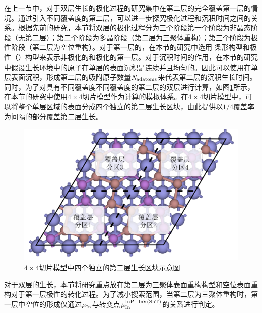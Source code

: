 在上一节中，对于双层生长的极化过程的研究集中在第二层的完全覆盖第一层的情况。通过引入不同覆盖度的第二层，可以进一步探究极化过程和沉积时间之间的关系。根据先前的研究，本节将双层的极化过程分为三个阶段\chinesecolon 第一个阶段为非晶态阶段（无第二层）；第二个阶段为多晶阶段（第二层为三聚体重构）；第三个阶段为极性阶段（第二层为空位重构）。对于第一层的，在本节的研究中选用 条形构型和极性（）构型来表示非极化的和极化的第一层。对于沉积时间的作用，在本节的研究中假设生长环境中的原子在单层的表面沉积是连续并且均匀的。因此可以使用在单层表面沉积，形成第二层的吸附原子数量$\it N_{\rm adatoms} \it$来代表第二层的沉积生长时间。同时，为了对具有不同覆盖度不同覆盖度的第二层的双层进行计算，如图\ref{fig:IS_diagram_2Linsb_partial}所示，在本节的研究中使用$4 \times 4$切片模型作为计算的模拟体系。在$4 \times 4$切片模型中，可以将整个单层区域的表面分成四个独立的第二层生长区块，由此提供以$1/ 4$覆盖率为间隔的部分覆盖第二层生长。


\begin{figure}[ht]
    \includegraphics{pic/IS_diagram_2Linsb_partial.png}
    \caption{$4 \times 4$切片模型中四个独立的第二层生长区块示意图}
    \label{fig:IS_diagram_2Linsb_partial}
\end{figure}

对于双层的生长，本节将研究重点放在第二层为三聚体表面重构构型和空位表面重构对于第一层极性的转化过程。为了减小搜索范围，当第二层为三聚体重构时，第一层中空位的形成仅通过$\it \mu_{\rm In}^{\rm } \it$与转变点$\it \mu_{\rm In}^{\rm InP-InV\left(SbT\right)} \it$的关系进行判定。

